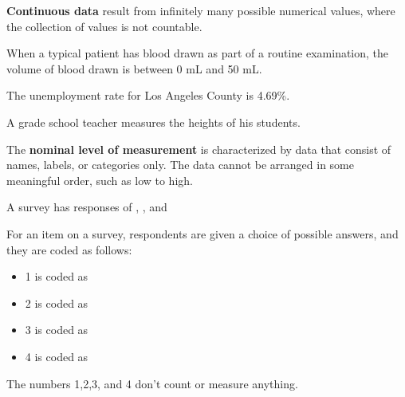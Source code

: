 \documentclass{beamer}
\begin{document}
\begin{frame}
\begin{definition}
\textbf{Continuous data} result from infinitely many possible numerical values, where the collection of values is not countable.
\end{definition}\pause

\begin{example}
When a typical patient has blood drawn as part of a routine examination, the volume of blood drawn is between 0 mL and 50 mL.
\end{example}\pause

\begin{example}
The unemployment rate for Los Angeles County is 4.69\%.
\end{example}\pause

\begin{example}
A grade school teacher measures the heights of his students.
\end{example}
\end{frame}

\begin{frame}
\begin{definition}
The \textbf{nominal level of measurement} is characterized by data that consist of names, labels, or categories only. The data cannot be arranged in some meaningful order, such as low to high.
\end{definition}\pause

\begin{example}
A survey has responses of , , and 
\end{example}\pause

\begin{example}
For an item on a survey, respondents are given a choice of possible answers, and they are coded as follows:
\begin{itemize}
\item[] 1 is coded as 
\item[] 2 is coded as 
\item[] 3 is coded as 
\item[] 4 is coded as 
\end{itemize}
The numbers 1,2,3, and 4 don't count or measure anything.
\end{example}
\end{frame}
\end{document}
